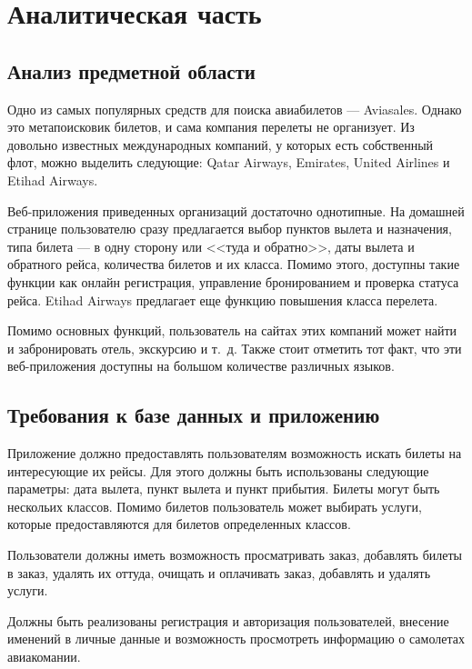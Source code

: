 \documentclass{bmstu}
\begin{document}
\chapter{Аналитическая часть}

\section{Анализ предметной области}

Одно из самых популярных средств для поиска авиабилетов --- Aviasales. 
Однако это метапоисковик билетов, и сама компания перелеты не организует. 
Из довольно известных международных компаний, у которых есть собственный флот, можно выделить следующие: Qatar Airways, Emirates, United Airlines и Etihad Airways. 

Веб-приложения приведенных организаций достаточно однотипные. 
На домашней странице пользователю сразу предлагается выбор пунктов вылета и назначения, типа билета --- в одну сторону или <<туда и обратно>>, даты вылета и обратного рейса, количества билетов и их класса. 
Помимо этого, доступны такие функции как онлайн регистрация, управление бронированием и проверка статуса рейса. 
Etihad Airways предлагает еще функцию повышения класса перелета.

Помимо основных функций, пользователь на сайтах этих компаний может найти и забронировать отель, экскурсию и т.~д. 
Также стоит отметить тот факт, что эти веб-приложения доступны на большом количестве различных языков.

\section{Требования к базе данных и приложению}

Приложение должно предоставлять пользователям возможность искать билеты на интересующие их рейсы. 
Для этого должны быть использованы следующие параметры: дата вылета, пункт вылета и пункт прибытия. 
Билеты могут быть нескольих классов. 
Помимо билетов пользователь может выбирать услуги, которые предоставляются для билетов определенных классов.

Пользователи должны иметь возможность просматривать заказ, добавлять билеты в заказ, удалять их оттуда, очищать и оплачивать заказ, добавлять и удалять услуги.
 
Должны быть реализованы регистрация и авторизация пользователей, внесение именений в личные данные и возможность просмотреть информацию о самолетах авиакомании.
\end{document}
